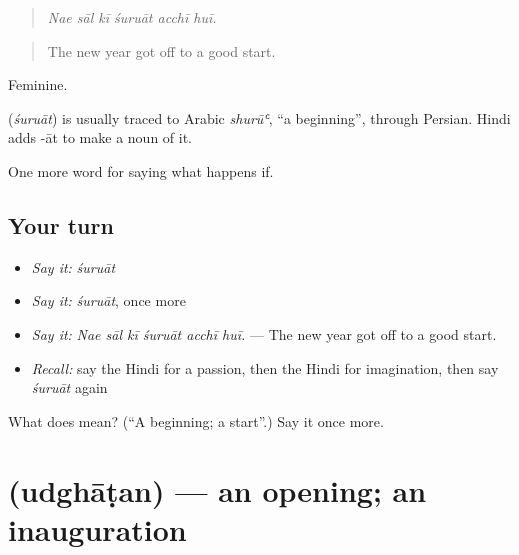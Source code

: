 \begin{quote}
     
\end{quote}

\begin{quote}
\emph{Nae sāl kī śuruāt acchī huī.}
\end{quote}

\begin{quote}
The new year got off to a good start.
\end{quote}

Feminine.

\begin{cousinweb}
\textbf{} (\emph{śuruāt}) is usually traced to Arabic \emph{shurūʿ}, \textquotedblleft{}a beginning\textquotedblright{}, through Persian. Hindi adds -āt to make a noun of it.
\end{cousinweb}

\begin{grammarlens}[title={What you've built}]
One more word for saying what happens if.
\end{grammarlens}

\subsection*{Your turn}
\begin{itemize}
\raggedright
  \item \emph{Say it:} \emph{śuruāt}
  \item \emph{Say it:} \emph{śuruāt}, once more
  \item \emph{Say it:} \emph{Nae sāl kī śuruāt acchī huī.} — The new year got off to a good start.
  \item \emph{Recall:} say the Hindi for a passion, then the Hindi for imagination, then say \emph{śuruāt} again
\end{itemize}

\begin{tcolorbox}[breakable,colback=teal!4,colframe=teal!35!black,title={Before you move on}]
What does  mean? (\textquotedblleft{}A beginning; a start\textquotedblright{}.) Say it once more.
\end{tcolorbox}
\section[\texorpdfstring{\hi{उद्घाटन} (udghāṭan)}{उद्घाटन (udghāṭan)}]{ (udghāṭan) — an opening; an inauguration}

